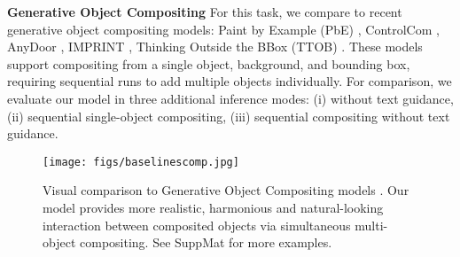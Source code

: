 \noindent
\textbf{Generative Object Compositing}
For this task, we compare to recent generative object compositing models: Paint by Example (PbE) \cite{yang2023paintbyexample}, ControlCom \cite{zhang2023controlcom}, AnyDoor \cite{chen2023anydoor}, IMPRINT \cite{song2024imprint}, Thinking Outside the BBox (TTOB) \cite{tarres2024thinking}. These models support compositing from a single object, background, and bounding box, requiring sequential runs to add multiple objects individually. For comparison, we evaluate our model in three additional inference modes: (i) without text guidance, (ii) sequential single-object compositing, (iii) sequential compositing without text guidance. %

\begin{figure*}[t]
    \centering
    \texttt{[image: figs/baselinescomp.jpg]}
    \caption{Visual comparison to Generative Object Compositing models \cite{yang2023paintbyexample,zhang2023controlcom,chen2023anydoor,song2024imprint,tarres2024thinking}. Our model provides more realistic, harmonious and natural-looking interaction between composited objects via simultaneous multi-object compositing. See SuppMat for more examples.}

    \label{fig:baselinescomp}
    \vspace{-6mm}
\end{figure*}


